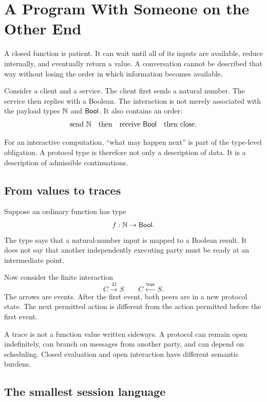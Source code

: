 
\chapter{A Program With Someone on the Other End}

A closed function is patient. It can wait until all of its inputs are available, reduce internally,
and eventually return a value. A conversation cannot be described that way without losing the
order in which information becomes available.

Consider a client and a service. The client first sends a natural number. The service then replies
with a Boolean. The interaction is not merely associated with the payload types
\(\mathbb{N}\) and \(\mathsf{Bool}\). It also contains an order:
\[
   \text{send }\mathbb{N} \quad\text{then}\quad \text{receive }\mathsf{Bool} \quad\text{then close}.
\]

\begin{principle}
For an interactive computation, ``what may happen next'' is part of the type-level obligation.
A protocol type is therefore not only a description of data. It is a description of admissible
continuations.
\end{principle}

\section{From values to traces}

Suppose an ordinary function has type
\[
  f : \mathbb{N} \to \mathsf{Bool}.
\]
The type says that a natural-number input is mapped to a Boolean result. It does not say that
another independently executing party must be ready at an intermediate point.

Now consider the finite interaction
\[
  C \xrightarrow{\,42\,} S
  \qquad
  C \xleftarrow{\,\mathsf{true}\,} S.
\]
The arrows are events. After the first event, both peers are in a new protocol state. The next
permitted action is different from the action permitted before the first event.



\begin{warningbox}
A trace is not a function value written sideways. A protocol can remain open indefinitely, can
branch on messages from another party, and can depend on scheduling. Closed evaluation and open
interaction have different semantic burdens.
\end{warningbox}

\section{The smallest session language}

